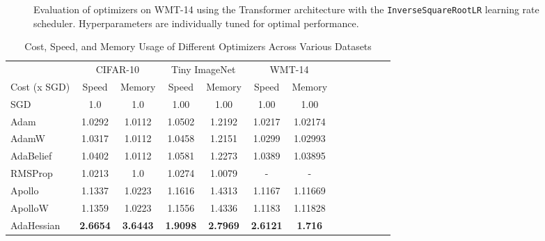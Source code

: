 \begin{figure}[h!]
    \centering
    \begin{tabular}{cc}
         \\ %
        
    \end{tabular}
    \caption{Evaluation of optimizers on WMT-14 using the Transformer architecture with the \texttt{InverseSquareRootLR} learning rate scheduler.
    Hyperparameters are individually tuned for optimal performance.}
    \label{fig:wmt14-perf-opt}
\end{figure}

\begin{table}[h!]
    \centering
    \caption{Cost, Speed, and Memory Usage of Different Optimizers Across Various Datasets}
    \label{tab:optimizer_comparison_perf}
    \begin{tabular}{lcccccccccccc}
        \toprule
        & \multicolumn{2}{c}{CIFAR-10} & \multicolumn{2}{c}{Tiny ImageNet}  & \multicolumn{2}{c}{WMT-14} \\
        \cmidrule(lr){2-3} \cmidrule(lr){4-5}  \cmidrule(lr){6-7} 
        Cost (x SGD) & Speed & Memory  & Speed & Memory  & Speed & Memory  \\
        \midrule
        SGD         & 1.0 & 1.0 & 1.00 & 1.00 & 1.00 & 1.00  \\
        Adam        & 1.0292 & 1.0112 & 1.0502 & 1.2192& 1.0217 & 1.02174 \\
        AdamW       & 1.0317 & 1.0112 & 1.0458& 1.2151 &  1.0299 & 1.02993 \\
        AdaBelief   & 1.0402 & 1.0112 & 1.0581 & 1.2273 & 1.0389 & 1.03895 \\
        RMSProp     & 1.0213 & 1.0 & 1.0274 & 1.0079 & - & - \\
        Apollo      & 1.1337 & 1.0223 & 1.1616 & 1.4313 & 1.1167 & 1.11669  \\
        ApolloW     & 1.1359 & 1.0223 & 1.1556 & 1.4336 & 1.1183& 1.11828   \\
        AdaHessian  & \textbf{2.6654} &\textbf{3.6443}& \textbf{1.9098}  & \textbf{2.7969} & \textbf{2.6121} &\textbf{1.716}\\
        \bottomrule
    \end{tabular}
\end{table}




